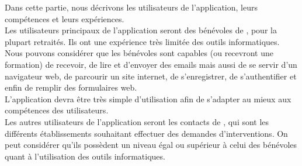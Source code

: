 Dans cette partie, nous décrivons les utilisateurs de l'application, leurs compétences et leurs expériences.\\

Les utilisateurs principaux de l'application seront des bénévoles de \nomClient{}, pour la plupart retraités. Ils ont une expérience très limitée des outils informatiques. Nous pouvons considérer que les bénévoles sont capables (ou recevront une formation) de recevoir, de lire et d'envoyer des emails mais aussi de se servir d'un navigateur web, de parcourir un site internet, de s'enregistrer, de s'authentifier et enfin de remplir des formulaires web.\\

L'application devra être très simple d'utilisation afin de s'adapter au mieux aux compétences des utilisateurs.\\

Les autres utilisateurs de l'application seront les contacts de \nomClient{}, qui sont les différents établissements souhaitant effectuer des demandes d'interventions. On peut considérer qu'ils possèdent un niveau égal ou supérieur à celui des bénévoles quant à l'utilisation des outils informatiques.
